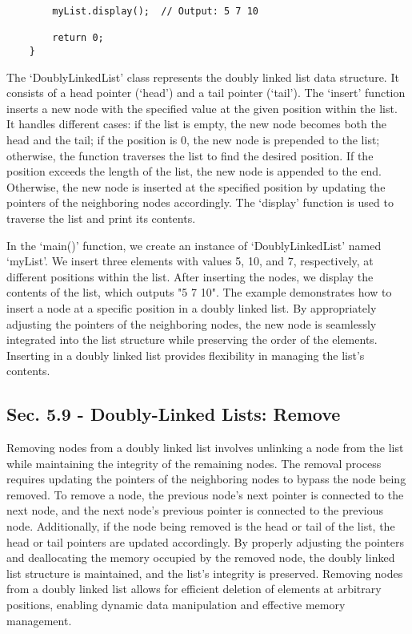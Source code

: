 \begin{solution}
\begin{verbatim}
        myList.display();  // Output: 5 7 10
    
        return 0;
    }        
    \end{verbatim}

    \horizontalline

    The `DoublyLinkedList' class represents the doubly linked list data structure. It consists of a head pointer (`head') and a tail pointer (`tail'). The `insert' function inserts a new node with the specified value at the given position within the list. It handles different cases: if the list is empty, the new node 
    becomes both the head and the tail; if the position is 0, the new node is prepended to the list; otherwise, the function traverses the list to find the desired position. If the position exceeds the length of the list, the new node is appended to the end. Otherwise, the new node is inserted at the specified position 
    by updating the pointers of the neighboring nodes accordingly. The `display' function is used to traverse the list and print its contents.

    In the `main()' function, we create an instance of `DoublyLinkedList' named `myList'. We insert three elements with values 5, 10, and 7, respectively, at different positions within the list. After inserting the nodes, we display the contents of the list, which outputs "5 7 10". The example demonstrates how to insert 
    a node at a specific position in a doubly linked list. By appropriately adjusting the pointers of the neighboring nodes, the new node is seamlessly integrated into the list structure while preserving the order of the elements. Inserting in a doubly linked list provides flexibility in managing the list's contents.
\end{solution}

\subsection*{Sec. 5.9 - Doubly-Linked Lists: Remove}

Removing nodes from a doubly linked list involves unlinking a node from the list while maintaining the integrity of the remaining nodes. The removal process requires updating the pointers of the neighboring nodes to bypass the node being removed. To remove a node, the previous node's next pointer is connected to the next node, 
and the next node's previous pointer is connected to the previous node. Additionally, if the node being removed is the head or tail of the list, the head or tail pointers are updated accordingly. By properly adjusting the pointers and deallocating the memory occupied by the removed node, the doubly linked list structure is 
maintained, and the list's integrity is preserved. Removing nodes from a doubly linked list allows for efficient deletion of elements at arbitrary positions, enabling dynamic data manipulation and effective memory management.

